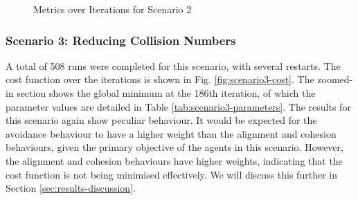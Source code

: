 \documentclass[12pt]{article}
\begin{document}
\begin{figure}[ht]
    \centering
    \caption{Metrics over Iterations for Scenario 2}
    \label{fig:scenario2-metrics}
\end{figure}

\subsubsection{Scenario 3: Reducing Collision Numbers}
A total of 508 runs were completed for this scenario, with several restarts. The cost function over the iterations is shown in Fig. \ref{fig:scenario3-cost}. The zoomed-in section shows the global minimum at the 186th iteration, of which the parameter values are detailed in Table \ref{tab:scenario3-parameters}. The results for this scenario again show peculiar behaviour. It would be expected for the avoidance behaviour to have a higher weight than the alignment and cohesion behaviours, given the primary objective of the agents in this scenario. However, the alignment and cohesion behaviours have higher weights, indicating that the cost function is not being minimised effectively. We will discuss this further in Section \ref{sec:results-discussion}.
\end{document}
